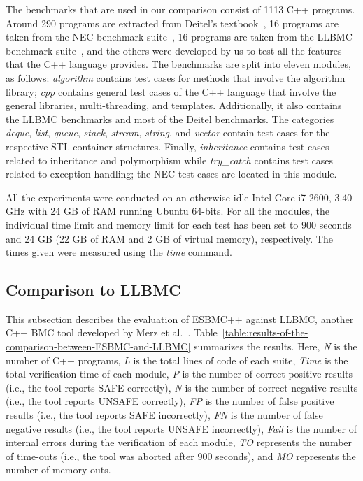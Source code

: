 \documentclass[conference]{IEEEtran}
\begin{document}
The benchmarks that are used in our comparison consist of 1113 C++ programs.
Around 290 programs are extracted from Deitel's textbook~\cite{Deitel},
16 programs are taken from the NEC benchmark suite~\cite{NeclabsBenchmarkExceptions},
16 programs are taken from the LLBMC benchmark suite~\cite{PrabhuMBIG11},
and the others were developed by us to test all the features that the C++ language
provides. The benchmarks are split into eleven modules, as follows:
\textit{algorithm} contains test cases for methods that involve the
algorithm library; \textit{cpp} contains general test cases of the C++
language that involve the general libraries, multi-threading, and templates.
Additionally, it also contains the LLBMC benchmarks and most of the Deitel
benchmarks. The categories \textit{deque}, \textit{list}, \textit{queue},
\textit{stack}, \textit{stream}, \textit{string}, and \textit{vector} contain test cases
for the respective STL container structures.
Finally, \textit{inheritance} contains test cases related to inheritance and
polymorphism while \textit{try\_catch} contains test cases related to exception handling;
the NEC test cases are located in this module.

All the experiments were conducted on an otherwise idle Intel Core i7-2600,
3.40 GHz with 24 GB of RAM running Ubuntu 64-bits. For all the modules,
the individual time limit and memory limit for each test has been set to 900 seconds
and 24 GB (22 GB of RAM and 2 GB of virtual memory), respectively.
The times given were measured using the \textit{time} command.

\subsection{Comparison to LLBMC}
\label{comparison-to-LLBMC}

This subsection describes the evaluation of ESBMC++
against LLBMC, another C++ BMC tool developed by Merz et al.~\cite{Florian12}.
Table~\ref{table:results-of-the-comparison-between-ESBMC-and-LLBMC}
summarizes the results. Here, \textit{N} is the number of C++ programs,
\textit{L} is the total lines of code of each suite, \textit{Time} is the
total verification time of each module, \textit{P} is the
number of correct positive results (i.e., the tool reports SAFE correctly), 
\textit{N} is the number of correct negative results (i.e., the tool reports 
UNSAFE correctly), \textit{FP} is the number of false positive
results (i.e., the tool reports SAFE incorrectly), \textit{FN} is the number
of false negative results (i.e., the tool reports UNSAFE incorrectly), \textit{Fail}
is the number of internal errors during the verification of each module,
\textit{TO} represents the number of time-outs (i.e., the tool was
aborted after 900 seconds),
and \textit{MO} represents the number of memory-outs.
\end{document}

